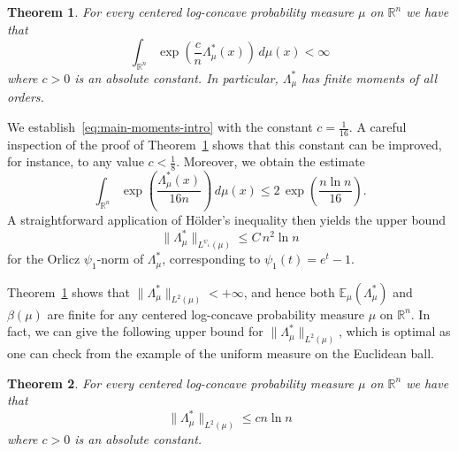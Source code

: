 \documentclass[11pt,leqno]{article}
\newtheorem{theorem}{Theorem}[section]
\theoremstyle{definition}
\theoremstyle{remark}
\numberwithin{equation}{section}
\newcommand{\ls}{\leqslant}
\newcommand{\1}{\textbf{1}}
\begin{document}
\begin{theorem}\label{th:moments}For every centered log-concave probability measure $\mu$ on ${\mathbb R}^n$
we have that
\begin{equation}\label{eq:main-moments-intro}\int_{{\mathbb R}^n}\exp\left(\frac{c}{n}\Lambda_{\mu}^{\ast }(x)\right)\,d\mu(x)<\infty \end{equation}
where $c>0$ is an absolute constant. In particular, $\Lambda_{\mu}^{\ast}$ has finite moments of all orders.
\end{theorem}

We establish~\eqref{eq:main-moments-intro} with the constant $c=\frac{1}{16}$. A careful inspection of the proof of
Theorem~\ref{th:moments} shows that this constant can be improved, for instance, to any value
$c<\frac{1}{8}$. Moreover, we obtain the estimate
$$\int_{\mathbb{R}^n} \exp\!\left(\frac{\Lambda_\mu^{\ast}(x)}{16n}\right)\, d\mu(x)
\ls 2\,\exp\!\left(\frac{n\ln n}{16}\right).$$
A straightforward application of H\"older's inequality then yields the upper bound
$$\|\Lambda_\mu^{\ast}\|_{L^{\psi_1}(\mu)} \le C\, n^2 \ln n$$
for the Orlicz $\psi_1$-norm of $\Lambda_\mu^{\ast}$, corresponding to $\psi_1(t)=e^t-1$.

Theorem~\ref{th:moments} shows that $\|\Lambda_{\mu}^{\ast}\|_{L^2(\mu)}<+\infty$, and hence both $\mathbb{E}_{\mu}(\Lambda_{\mu}^{\ast})$
and $\beta(\mu)$ are finite for any centered log-concave probability measure $\mu$ on $\mathbb{R}^n$. In fact, we can
give the following upper bound for $\|\Lambda_{\mu}^{\ast}\|_{L^2(\mu)}$, which is optimal as one can check from the example
of the uniform measure on the Euclidean ball.


\begin{theorem}\label{th:small-moments}For every centered log-concave probability measure $\mu$ on ${\mathbb R}^n$
we have that
$$\|\Lambda_{\mu}^{\ast}\|_{L^2(\mu)}\ls cn\ln n$$
where $c>0$ is an absolute constant.
\end{theorem}
\end{document}
